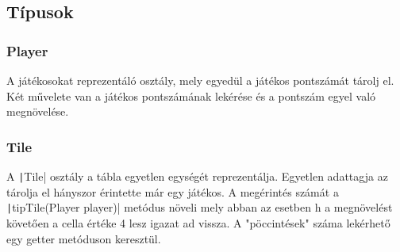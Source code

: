 \documentclass[a4paper,12pt]{article}
\begin{document}
	\subsection{Típusok}
	\subsubsection{Player}
	A játékosokat reprezentáló osztály, mely egyedül a játékos pontszámát tárolj el. Két művelete van a játékos pontszámának lekérése és a pontszám egyel való megnövelése.
	\subsubsection{Tile}
	A \texttt|Tile| osztály a tábla egyetlen egységét reprezentálja. Egyetlen adattagja az tárolja el hányszor érintette már egy játékos. A megérintés számát a \texttt|tipTile(Player player)| metódus növeli mely abban az esetben h a megnövelést követően a cella értéke 4 lesz igazat ad vissza. A "pöccintések" száma lekérhető egy getter metóduson keresztül.
\end{document}
